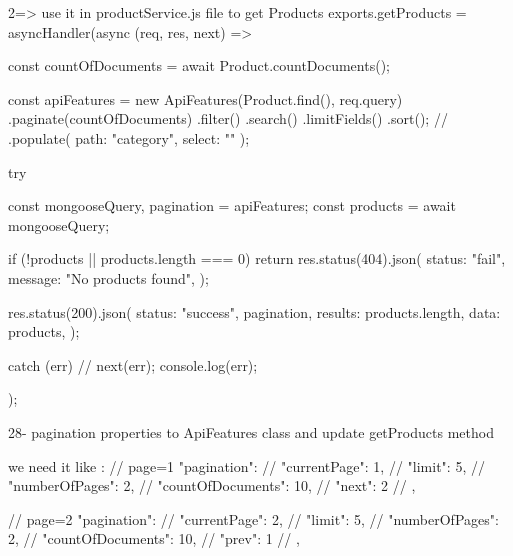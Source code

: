    2=> use it in productService.js file to get Products 
                exports.getProducts = asyncHandler(async (req, res, next) => {
                        const countOfDocuments = await Product.countDocuments();

                        const apiFeatures = new ApiFeatures(Product.find(), req.query)
                            .paginate(countOfDocuments)
                            .filter()
                            .search()
                            .limitFields()
                            .sort();
                        // .populate({ path: "category", select: "" });

                        try {
                            const { mongooseQuery, pagination } = apiFeatures;
                            const products = await mongooseQuery;

                            if (!products || products.length === 0) {
                            return res.status(404).json({
                                status: "fail",
                                message: "No products found",
                            });
                            }

                            res.status(200).json({
                            status: "success",
                            pagination,
                            results: products.length,
                            data: products,
                            });
                        } catch (err) {
                            // next(err);
                            console.log(err);
                        }
                });


28- pagination properties to ApiFeatures class and update getProducts method

    we need it like : 
                //  page=1   "pagination": {
                //                      "currentPage": 1,
                //                        "limit": 5,
                //                        "numberOfPages": 2,
                //                        "countOfDocuments": 10,
                //                        "next": 2
                //                },

                        //  page=2  "pagination": {
                        //                  "currentPage": 2,
                        //                  "limit": 5,
                        //                  "numberOfPages": 2,
                        //                  "countOfDocuments": 10,
                        //                  "prev": 1
                        //                },

